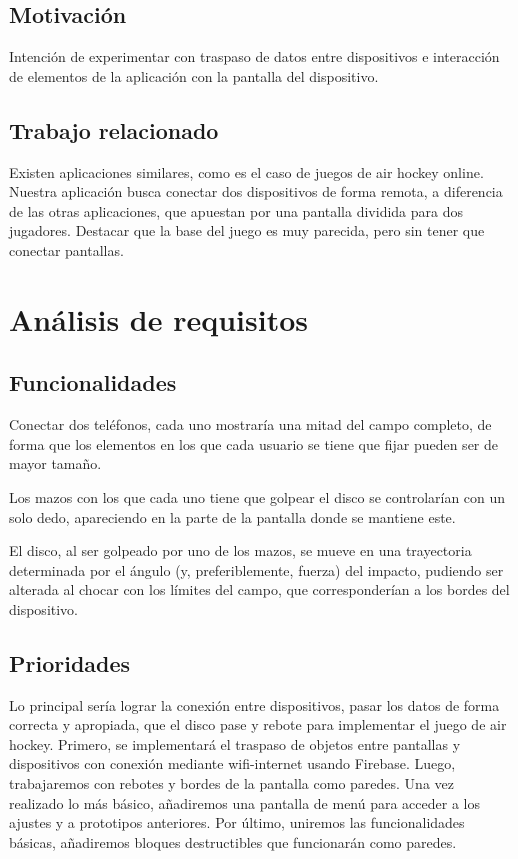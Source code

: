 \documentclass[a4paper,openright,12pt]{article}
\begin{document}
\subsection{Motivación}
Intención de experimentar con traspaso de datos entre dispositivos e interacción de elementos de la aplicación con la pantalla del dispositivo.
\subsection{Trabajo relacionado}
Existen aplicaciones similares, como es el caso de juegos de air hockey online. Nuestra aplicación busca conectar dos dispositivos de forma remota, a diferencia de las otras aplicaciones, que apuestan por una pantalla dividida para dos jugadores. Destacar que la base del juego es muy parecida, pero sin tener que conectar pantallas.

\section{Análisis de requisitos}

\subsection{Funcionalidades}
Conectar dos teléfonos, cada uno mostraría una mitad del campo completo, de forma que los elementos en los que cada usuario se tiene que fijar pueden ser de mayor tamaño.
 
Los mazos con los que cada uno tiene que golpear el disco se controlarían con un solo dedo, apareciendo en la parte de la pantalla donde se mantiene este.
 
El disco, al ser golpeado por uno de los mazos, se mueve en una trayectoria determinada por el ángulo (y, preferiblemente, fuerza) del impacto, pudiendo ser alterada al chocar con los límites del campo, que corresponderían a los bordes del dispositivo.
\subsection{Prioridades}
Lo principal sería lograr la conexión entre dispositivos, pasar los datos de forma correcta y apropiada, que el disco pase y rebote para implementar el juego de air hockey.
Primero, se implementará el traspaso de objetos entre pantallas y dispositivos con conexión mediante wifi-internet usando Firebase.
Luego, trabajaremos con rebotes y bordes de la pantalla como paredes.
Una vez realizado lo más básico, añadiremos una pantalla de menú para acceder a los ajustes y a prototipos anteriores. 
Por último, uniremos las funcionalidades básicas, añadiremos bloques destructibles que funcionarán como paredes.
\end{document}
